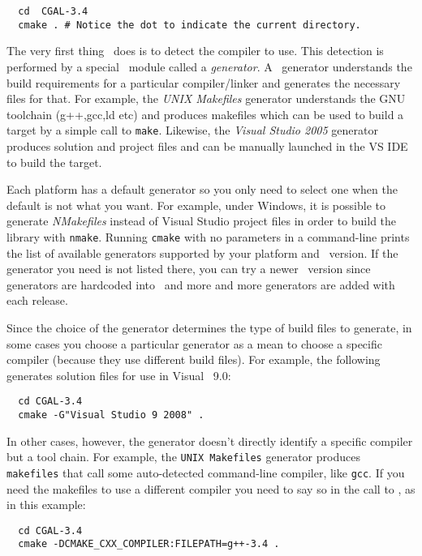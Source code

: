 {\ccTexHtml{\scriptsize}{}
\begin{verbatim}
  cd  CGAL-3.4
  cmake . # Notice the dot to indicate the current directory.
\end{verbatim}
}


The very first thing \cmake\ does is to detect the compiler to use.
This detection is performed by a special \cmake\ module called a {\em generator}. A
\cmake\ generator understands the build requirements for a particular compiler/linker
 and generates the necessary files for that. For example, the 
{\em UNIX Makefiles} generator understands the GNU toolchain (g++,gcc,ld etc) and produces makefiles
which can be used to build a target by a simple call to \texttt{make}.
Likewise, the {\em Visual Studio 2005} generator produces solution and project files and can be manually
launched in the VS IDE to build the target.

Each platform has a default generator so you only need to select one when the default is
not what you want. 
For example, under Windows, it is possible to generate {\em NMakefiles}
instead of Visual Studio project files in order to build the library with \texttt{nmake}.
Running \texttt{cmake} with no parameters in a command-line prints the list of available generators supported 
by your platform and \cmake\ version. If the generator you need is not listed there, you can
try a newer \cmake\ version since generators are hardcoded into \cmake\ and more and
more generators are added with each release.

Since the choice of the generator determines the type of build files to generate, in some cases
you choose a particular generator as a mean to choose a specific compiler (because they use different 
build files). For example, the following generates solution files for use in Visual \CC\ 9.0:

{\ccTexHtml{\scriptsize}{}
\begin{verbatim}
  cd CGAL-3.4
  cmake -G"Visual Studio 9 2008" . 
\end{verbatim}
}

In other cases, however, the generator doesn't directly identify a specific compiler but a tool chain.
For example, the \texttt{UNIX Makefiles} generator produces \texttt{makefiles} that call some auto-detected
command-line compiler, like \texttt{gcc}. If you need the makefiles to use a different compiler you need to
say so in the call to \cmake{}, as in this example:

{\ccTexHtml{\scriptsize}{}
\begin{verbatim}
  cd CGAL-3.4
  cmake -DCMAKE_CXX_COMPILER:FILEPATH=g++-3.4 . 
\end{verbatim}
}


